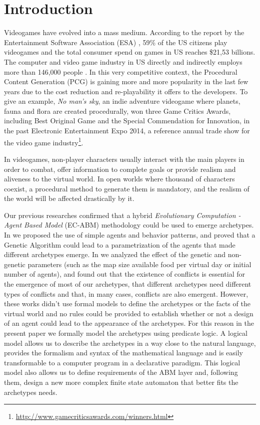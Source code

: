\documentclass[conference]{IEEEtran}
\begin{document}
\section{Introduction}
\label{sec:intro}

Videogames have evolved into a mass medium. According to the report by
the Entertainment Software Association (ESA) \cite{esa_ef_2014}, 59\%
of the US citizens play videogames and the total consumer spend on
games in US reaches \$21,53 billions. The computer and video game
industry in US directly and indirectly employs more than 146,000
people \cite{esa_century_2014}. In this very competitive context, the
Procedural Content Generation (PCG) is gaining more and more
popularity in the last few years due to the cost reduction and
re-playability it offers to the developers. To give an example,
\textit{No man's sky}, an indie adventure videogame where planets,
fauna and flora are created procedurally, won three Game Critics
Awards, including Best Original Game and the Special Commendation for
Innovation, in the past Electronic Entertainment Expo 2014, a
reference annual trade show for the video game
industry\footnote{\url{http://www.gamecriticsawards.com/winners.html}}. 

In videogames, non-player characters usually interact with the main
players in order to combat, offer information to complete goals or
provide realism and aliveness to the virtual world. In open worlds
where thousand of characters coexist, a procedural method to generate
them is mandatory, and the realism of the world will be affected
drastically by it.

Our previous researches confirmed that a hybrid \textit{Evolutionary Computation - Agent Based Model} (EC-ABM) methodology could be used to emerge archetypes. In \cite{garcia14my} we proposed the use of simple agents and behavior patterns, and proved that a Genetic Algorithm could lead to a parametrization of the agents that made different archetypes emerge. In \cite{garcia2015world} we analyzed the effect of the genetic and non-genetic parameters (such as the map size available food per virtual day or initial number of agents), and found out that the existence of conflicts is essential for the emergence of most of our archetypes, that different archetypes need different types of conflicts and that, in many cases, conflicts are also emergent. However, these works didn't use formal models to define the archetypes or the facts of the virtual world and no rules could be provided to establish whether or not a design of an agent could lead to the appearance of the archetypes. For this reason in the present paper we formally model the archetypes using predicate logic. A logical model allows us to describe the archetypes in a way close to the natural language, provides the formalism and syntax of the mathematical language and is easily transformable to a computer program in a declarative paradigm. This logical model also allows us to define requirements of the ABM layer and, following them, design a new more complex finite state automaton that better fits the archetypes needs.
\end{document}
